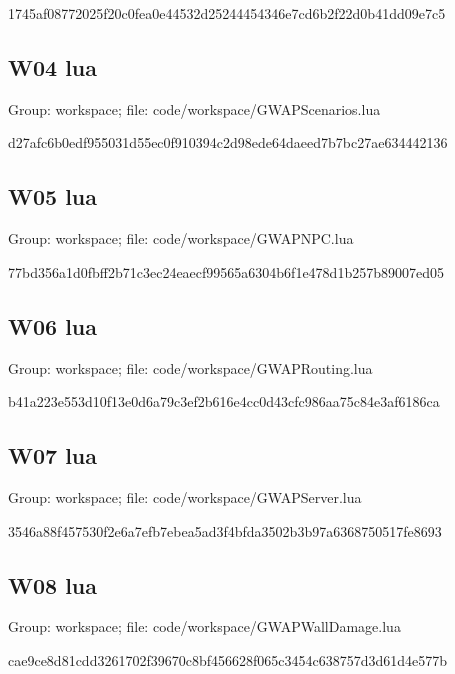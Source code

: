 \begin{flushleft}\ttfamily\footnotesize 1745af08772025f20c0fea0e44532d25244454346e7cd6b2f22d0b41dd09e7c5\end{flushleft}
\subsection{W04 lua}
Group: workspace; file: code/\allowbreak{}workspace/\allowbreak{}GWAPScenarios.\allowbreak{}lua

\begin{flushleft}\ttfamily\footnotesize d27afc6b0edf955031d55ec0f910394c2d98ede64daeed7b7bc27ae634442136\end{flushleft}
\subsection{W05 lua}
Group: workspace; file: code/\allowbreak{}workspace/\allowbreak{}GWAPNPC.\allowbreak{}lua

\begin{flushleft}\ttfamily\footnotesize 77bd356a1d0fbff2b71c3ec24eaecf99565a6304b6f1e478d1b257b89007ed05\end{flushleft}
\subsection{W06 lua}
Group: workspace; file: code/\allowbreak{}workspace/\allowbreak{}GWAPRouting.\allowbreak{}lua

\begin{flushleft}\ttfamily\footnotesize b41a223e553d10f13e0d6a79c3ef2b616e4cc0d43cfc986aa75c84e3af6186ca\end{flushleft}
\subsection{W07 lua}
Group: workspace; file: code/\allowbreak{}workspace/\allowbreak{}GWAPServer.\allowbreak{}lua

\begin{flushleft}\ttfamily\footnotesize 3546a88f457530f2e6a7efb7ebea5ad3f4bfda3502b3b97a6368750517fe8693\end{flushleft}
\subsection{W08 lua}
Group: workspace; file: code/\allowbreak{}workspace/\allowbreak{}GWAPWallDamage.\allowbreak{}lua

\begin{flushleft}\ttfamily\footnotesize cae9ce8d81cdd3261702f39670c8bf456628f065c3454c638757d3d61d4e577b\end{flushleft}
